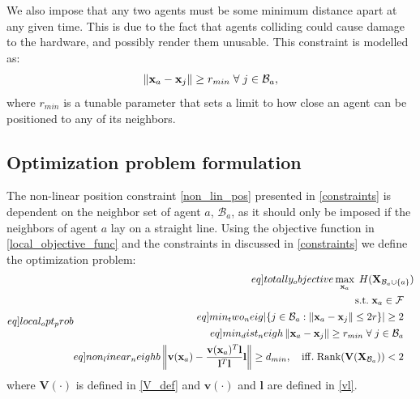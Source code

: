 We also impose that any two agents must be some minimum distance apart at any given time. This is due to the fact that agents colliding could cause damage to the hardware, and possibly render them unusable.
This constraint is modelled as:
\begin{equation}
  \left\lVert\mathbf{x}_{a} - \mathbf{x}_{j}\right\rVert \geq r_{min} \;\forall\;j\in\mathcal{B}_{a},
\end{equation}
where $r_{min}$ is a tunable parameter that sets a limit to how close an agent can be positioned to any of its neighbors.\clearpage
\subsection{Optimization problem formulation}
The non-linear position constraint \eqref{non_lin_pos} presented in \ref{constraints} is dependent on the neighbor set of agent $a$, $\mathcal{B}_{a}$, as it should only be imposed if the 
neighbors of agent $a$ lay on a straight line. Using the objective function in \eqref{local_objective_func} and the constraints in discussed in \ref{constraints} we define the optimization problem:
\begin{subequations}\label[eq]{local_opt_prob}
  \begin{align}
    \begin{split}\label[eq]{totally_objective}
      &\max_{\mathbf{x}_{a}}\;H(\mathbf{X}_{\mathcal{B}_{a}\cup\{a\}})\\
    \end{split}\\
    \mathrm{s.t.}\;
    \begin{split}
      &\mathbf{x}_{a}\in\mathcal{F}
    \end{split}\\
    \begin{split}\label[eq]{min_two_neig}
      &|\{j\in\mathcal{B}_{a}: \norm{\mathbf{x}_{a} - \mathbf{x}_{j}} \leq 2r\}|\geq 2
    \end{split}\\
    \begin{split}\label[eq]{min_dist_neigh}
      &\norm{\mathbf{x}_{a} - \mathbf{x}_{j}} \geq r_{min}\;\forall\;j\in\mathcal{B}_{a}
    \end{split}\\
    \begin{split}\label[eq]{non_linear_neighb}
      &\norm{\mathbf{v}(\mathbf{x}_{a}) - \frac{\mathbf{v}(\mathbf{x}_{a})^{T}\mathbf{l}}{\mathbf{l}^{T}\mathbf{l}}\mathbf{l}}\geq d_{min},\quad\mathrm{iff.}\;\mathrm{Rank}(\mathbf{V}(\mathbf{X}_{\mathcal{B}_{a}}))<2
    \end{split}
\end{align}
\end{subequations}
where $\mathbf{V}(\cdot)$ is defined in \eqref{V_def} and $\mathbf{v}(\cdot)$ and $\mathbf{l}$ are defined in \eqref{vl}.

